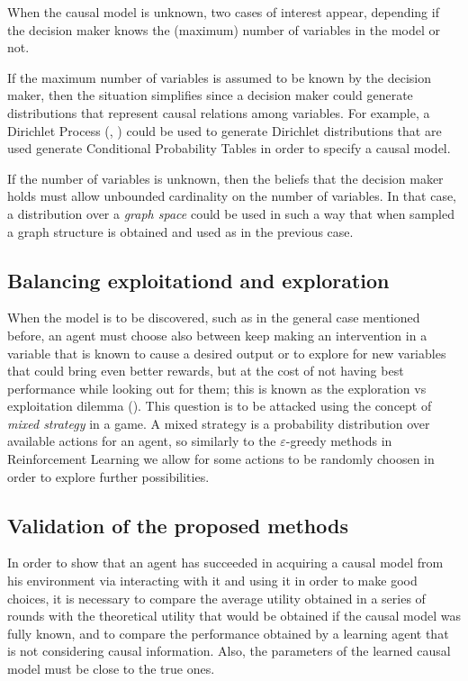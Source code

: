 \documentclass[english,letterpaper,12pt,final]{article}
\theoremstyle{definition}
\begin{document}
When the causal model is unknown, two cases of interest appear, depending if the decision maker knows the (maximum) number of variables in the model or not. 

If the maximum number of variables is assumed to be known by the decision maker, then the situation simplifies since a decision maker could generate distributions that represent causal relations among variables. For example, a Dirichlet Process (\cite{ferguson1973bayesian}, \cite{ghosal2017fundamentals}) could be used to generate Dirichlet distributions that are used generate Conditional Probability Tables in order to specify a causal model.

If the number of variables is unknown, then the beliefs that the decision maker holds must allow unbounded cardinality on the number of variables. In that case, a distribution over a \textit{graph space} could be used in such a way that when sampled a graph structure is obtained and used as in the previous case.  

\subsection{Balancing exploitationd and exploration}
When the model is to be discovered, such as in the general case mentioned before, an agent must choose also between keep making an intervention in a variable that is known to cause a desired output or to explore for new variables that could bring even better rewards, but at the cost of not having best performance while looking out for them; this is known as the exploration vs exploitation dilemma (\cite{sutton1998reinforcement}). This question is to be attacked using the concept of \textit{mixed strategy} in a game. A mixed strategy is a probability distribution over available actions for an agent, so similarly to the $\varepsilon$-greedy methods in Reinforcement Learning we allow for some actions to be randomly choosen in order to explore further possibilities.

\subsection{Validation of the proposed methods}
In order to show that an agent has succeeded in acquiring a causal model from his environment via interacting with it and using it in order to make good choices, it is necessary to compare the average utility obtained in a series of rounds with the theoretical utility that would be obtained if the causal model was fully known, and to compare the performance obtained by a learning agent that is not considering causal information. Also, the parameters of the learned causal model must be close to the true ones.
\end{document}
